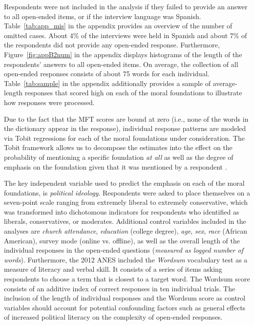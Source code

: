 \documentclass[12pt]{article}
\begin{document}
Respondents were not included in the analysis if they failed to provide an answer to all open-ended items, or if the interview language was Spanish. Table~\ref{tab:app_mis} in the appendix provides an overview of the number of omitted cases. About 4\% of the interviews were held in Spanish and about 7\% of the respondents did not provide any open-ended response. Furthermore, Figure~\ref{fig:appB2num} in the appendix displays histograms of the length of the respondents' answers to all open-ended items. On average, the collection of all open-ended responses consists of about 75 words for each individual. Table~\ref{tab:sample} in the appendix additionally provides a sample of average-length responses that scored high on each of the moral foundations to illustrate how responses were processed.

Due to the fact that the MFT scores are bound at zero (i.e., none of the words in the dictionary appear in the response), individual response patterns are modeled via Tobit regressions for each of the moral foundations under consideration. The Tobit framework allows us to decompose the estimates into the effect on the probability of mentioning a specific foundation \textit{at all} as well as the degree of emphasis on the foundation given that it was mentioned by a respondent \citep[see][for details on the decomposition of Tobit model estimates]{mcdonald1980uses}.

The key independent variable used to predict the emphasis on each of the moral foundations, is \textit{political ideology}. Respondents were asked to place themselves on a seven-point scale ranging from extremely liberal to extremely conservative, which was transformed into dichotomous indicators for respondents who identified as liberals, conservatives, or moderates. Additional control variables included in the analyses are \textit{church attendance}, \textit{education} (college degree), \textit{age}, \textit{sex}, \textit{race} (African American), survey mode (online vs. offline), as well as the overall length of the individual responses in the open-ended questions (\textit{measured as logged number of words}). Furthermore, the 2012 ANES included the \textit{Wordsum} vocabulary test as a measure of literacy and verbal skill. It consists of a series of items asking respondents to choose a term that is closest to a target word. The Wordsum score consists of an additive index of correct responses in ten individual trials. The inclusion of the length of individual responses and the Wordsum score as control variables should account for potential confounding factors such as general effects of increased political literacy on the complexity of open-ended responses.
\end{document}
